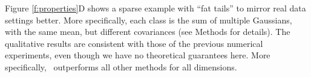 \documentclass[10pt]{article}
\begin{document}
 Figure \ref{f:properties}{\color{magenta}D} shows a sparse example with ``fat tails'' to mirror real data settings better. More specifically, each class is the sum of multiple Gaussians, with the same mean, but different covariances (see Methods for details). The qualitative results are consistent with those of the previous numerical experiments, even though  we have no theoretical guarantees here. More specifically, \Lol~outperforms all other methods for all dimensions.



\end{document}

